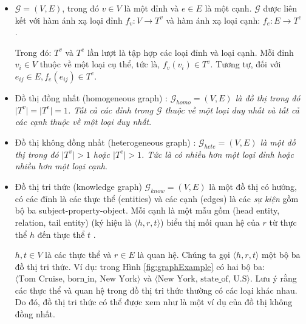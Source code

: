 \begin{itemize}
	\item \begin{definition}[Đồ thị]\label{def:defGraph}
		\(\mathcal{G} = (V, E)\), trong đó \(v \in V\) là một đỉnh và \(e \in E\) là một cạnh. \(\mathcal{G}\) được liên kết với hàm ánh xạ loại đỉnh \(f_v: V \to T^v\) và hàm ánh xạ loại cạnh: \(f_e: E \to T^e\) .
	\end{definition}
	
	Trong đó: \(T^v\) và \(T^e\) lần lượt là tập hợp các loại đỉnh và loại cạnh. Mỗi đỉnh \(v_i \in V\) thuộc về một loại cụ thể, tức là, \(f_v(v_i) \in T^v\). Tương tự, đối với \(e_{ij} \in E, f_e (e_{ij}) \in T^e\).
	
	\item
	\begin{definition}\label{def:homogeneous}
		Đồ thị đồng nhất (homogeneous graph) : \textit{ $\mathcal{G}_{homo} = (V, E)$ là đồ thị trong đó $\mid T^v \mid = \mid T^e \mid = 1$. Tất cả các đỉnh trong $\mathcal{G}$ thuộc về một loại duy nhất và tất cả các cạnh thuộc về một loại duy nhất}.
	\end{definition}
	
	\item
	\begin{definition}\label{def:heterogeneous}
		Đồ thị không đồng nhất (heterogeneous graph) : \textit{$\mathcal{G}_{hete} = (V, E)$ là một đồ thị trong đó $\mid T^v \mid > 1$ hoặc $\mid T^e \mid > 1$. Tức là có nhiều hơn một loại đỉnh hoặc nhiều hơn một loại cạnh}.
	\end{definition}
	
	\item
	\begin{definition}\label{def:knowledgeGraph}
		Đồ thị tri thức (knowledge graph)
		$\mathcal{G}_{know} = (V, E)$ là một đồ thị có hướng, có các đỉnh là các thực thể (entities) và các cạnh (edges) là các \textit{sự kiện} gồm bộ ba subject-property-object. Mỗi cạnh là một mẫu gồm (head entity, relation, tail entity) (ký hiệu là $\langle h, r, t \rangle$) biểu thị mối quan hệ của $r$ từ thực thể $h$ đến thực thể $t$ .
	\end{definition}
	$h, t \in V$ là các thực thể và $r \in E$ là quan hệ. Chúng ta gọi $\langle h, r, t \rangle$ một bộ ba đồ thị tri thức. Ví dụ: trong Hình \ref{fig:graphExample} có hai bộ ba: $\langle \text{Tom\ Cruise,\ born_in,\ New\ York} \rangle$ và $\langle \text{New York, state_of, U.S} \rangle$. Lưu ý rằng các thực thể và quan hệ trong đồ thị tri thức thường có các loại khác nhau. Do đó, đồ thị tri thức có thể được xem như là một ví dụ của đồ thị không đồng nhất.
\end{itemize}

